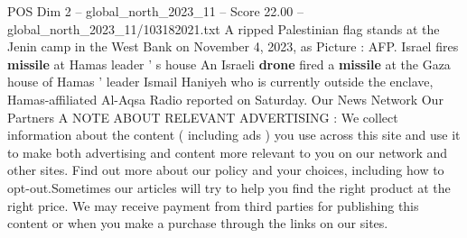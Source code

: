 \begin{textsample}{POS Dim 2 – global\_north\_2023\_11 – Score 22.00 – global\_north\_2023\_11/103182021.txt}
A ripped Palestinian flag stands at the Jenin camp in the West Bank on November 4, 2023, as Picture : AFP.
Israel fires \textbf{missile} at Hamas leader ' s house An Israeli \textbf{drone} fired a \textbf{missile} at the Gaza house of Hamas ' leader Ismail Haniyeh who is currently outside the enclave, Hamas-affiliated Al-Aqsa Radio reported on Saturday.
Our News Network Our Partners A NOTE ABOUT RELEVANT ADVERTISING : We collect information about the content ( including ads ) you use across this site and use it to make both advertising and content more relevant to you on our network and other sites.
Find out more about our policy and your choices, including how to opt-out.Sometimes our articles will try to help you find the right product at the right price.
We may receive payment from third parties for publishing this content or when you make a purchase through the links on our sites.

\end{textsample}
